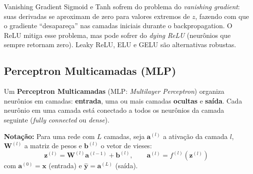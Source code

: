 \documentclass[12pt,a4paper]{article}
\begin{document}
\begin{atencaobox}{Vanishing Gradient}
Sigmoid e Tanh sofrem do problema do \textit{vanishing gradient}: suas derivadas se aproximam de zero para valores extremos de $z$, fazendo com que o gradiente ``desapareça'' nas camadas iniciais durante o backpropagation. O ReLU mitiga esse problema, mas pode sofrer do \textit{dying ReLU} (neurônios que sempre retornam zero). Leaky ReLU, ELU e GELU são alternativas robustas.
\end{atencaobox}

\subsection{Perceptron Multicamadas (MLP)}

Um \textbf{Perceptron Multicamadas} (MLP: \textit{Multilayer Perceptron}) organiza neurônios em camadas: \textbf{entrada}, uma ou mais camadas \textbf{ocultas} e \textbf{saída}. Cada neurônio em uma camada está conectado a todos os neurônios da camada seguinte (\textit{fully connected} ou \textit{dense}).

\textbf{Notação:} Para uma rede com $L$ camadas, seja $\mathbf{a}^{(l)}$ a ativação da camada $l$, $\mathbf{W}^{(l)}$ a matriz de pesos e $\mathbf{b}^{(l)}$ o vetor de vieses:
\[
  \mathbf{z}^{(l)} = \mathbf{W}^{(l)} \mathbf{a}^{(l-1)} + \mathbf{b}^{(l)}, \qquad
  \mathbf{a}^{(l)} = f^{(l)}\!\left(\mathbf{z}^{(l)}\right)
\]
com $\mathbf{a}^{(0)} = \mathbf{x}$ (entrada) e $\hat{\mathbf{y}} = \mathbf{a}^{(L)}$ (saída).
\end{document}
